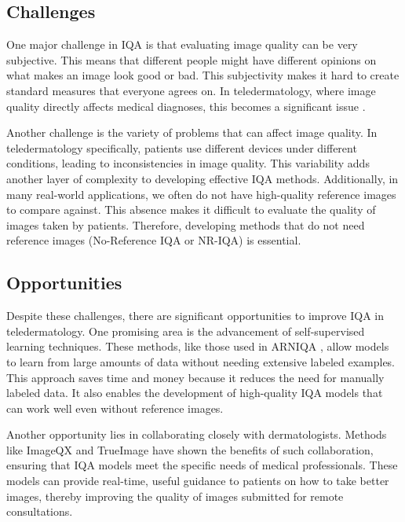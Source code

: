 \subsection{Challenges}
One major challenge in IQA is that evaluating image quality can be very subjective. This means that different people might have different opinions on what makes an image look good or bad. This subjectivity makes it hard to create standard measures that everyone agrees on. In teledermatology, where image quality directly affects medical diagnoses, this becomes a significant issue \autocite{D}. \par
\vspace{\baselineskip}
\noindent
Another challenge is the variety of problems that can affect image quality. In teledermatology specifically, patients use different devices under different conditions, leading to inconsistencies in image quality. This variability adds another layer of complexity to developing effective IQA methods. Additionally, in many real-world applications, we often do not have high-quality reference images to compare against. This absence makes it difficult to evaluate the quality of images taken by patients. Therefore, developing methods that do not need reference images (No-Reference IQA or NR-IQA) is essential. \par

\subsection{Opportunities}
Despite these challenges, there are significant opportunities to improve IQA in teledermatology. One promising area is the advancement of self-supervised learning techniques. These methods, like those used in ARNIQA \autocite{ARNIQA}, allow models to learn from large amounts of data without needing extensive labeled examples. This approach saves time and money because it reduces the need for manually labeled data. It also enables the development of high-quality IQA models that can work well even without reference images. \par
\vspace{\baselineskip}
\noindent
Another opportunity lies in collaborating closely with dermatologists. Methods like ImageQX \autocite{ImageQX} and TrueImage \autocite{TrueImage} have shown the benefits of such collaboration, ensuring that IQA models meet the specific needs of medical professionals. These models can provide real-time, useful guidance to patients on how to take better images, thereby improving the quality of images submitted for remote consultations. \par
